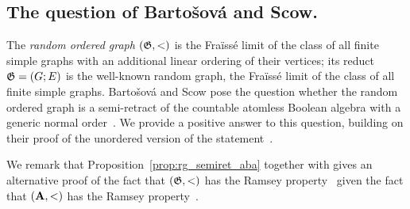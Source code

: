 \subsection*{The question of Barto\v{s}ov\'{a} and Scow.}
% 
The \emph{random ordered graph} $(\mathfrak{G},<)$ is the Fra\"{i}ss\'e limit of the class of all finite simple graphs with an additional linear ordering of their vertices; its reduct $\mathfrak{G}=(G;E)$ is the well-known random graph, the Fra\"{i}ss\'e limit of the class of all finite simple graphs.
%
Barto\v{s}ov\'a and Scow pose the question whether the random ordered graph is a semi-retract of the countable atomless Boolean algebra with a generic normal order~\cite[Question~4.3]{BARTOŠOVÁ_SCOW_2024}.
%  
We provide a positive answer to this question, building on their proof of the unordered version of the statement~\cite[Theorem~4.1]{BARTOŠOVÁ_SCOW_2024}. 

\semiretraction* 


We remark that Proposition~\ref{prop:rg_semiret_aba} together with \cite[Corollary 5.5]{BARTOŠOVÁ_SCOW_2024} gives an alternative proof of the fact that $(\mathfrak{G},<)$ has the Ramsey property~\cite[Theorem 6.2]{kechris2005fraisse} given the fact that $(\mathbf{A,<)}$ has the Ramsey property~\cite[Theorem 6.14]{kechris2005fraisse}.

